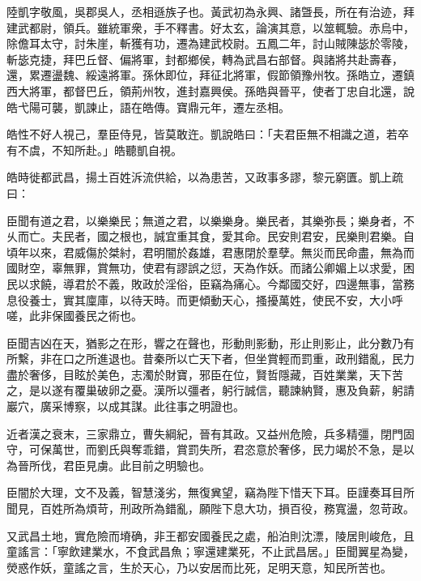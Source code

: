\begin{pinyinscope}
 
 
 陸凱字敬風，吳郡吳人，丞相遜族子也。黃武初為永興、諸曁長，所在有治迹，拜建武都尉，領兵。雖統軍衆，手不釋書。好太玄，論演其意，以筮輒驗。赤烏中，除儋耳太守，討朱崖，斬獲有功，遷為建武校尉。五鳳二年，討山賊陳毖於零陵，斬毖克捷，拜巴丘督、偏將軍，封都鄉侯，轉為武昌右部督。與諸將共赴壽春，還，累遷盪魏、綏遠將軍。孫休即位，拜征北將軍，假節領豫州牧。孫皓立，遷鎮西大將軍，都督巴丘，領荊州牧，進封嘉興侯。孫皓與晉平，使者丁忠自北還，說皓弋陽可襲，凱諫止，語在皓傳。寶鼎元年，遷左丞相。
 
 
 
 
 皓性不好人視己，羣臣侍見，皆莫敢迕。凱說皓曰：「夫君臣無不相識之道，若卒有不虞，不知所赴。」皓聽凱自視。
 
 
 
 
 皓時徙都武昌，揚土百姓泝流供給，以為患苦，又政事多謬，黎元窮匱。凱上疏曰：
 
 
 
 
 臣聞有道之君，以樂樂民；無道之君，以樂樂身。樂民者，其樂弥長；樂身者，不乆而亡。夫民者，國之根也，誠宜重其食，愛其命。民安則君安，民樂則君樂。自頃年以來，君威傷於桀紂，君明闇於姦雄，君惠閉於羣孽。無災而民命盡，無為而國財空，辜無罪，賞無功，使君有謬誤之愆，天為作妖。而諸公卿媚上以求愛，困民以求饒，導君於不義，敗政於淫俗，臣竊為痛心。今鄰國交好，四邊無事，當務息役養士，實其廩庫，以待天時。而更傾動天心，搔擾萬姓，使民不安，大小呼嗟，此非保國養民之術也。
 
 
 
 
 臣聞吉凶在天，猶影之在形，響之在聲也，形動則影動，形止則影止，此分數乃有所繫，非在口之所進退也。昔秦所以亡天下者，但坐賞輕而罰重，政刑錯亂，民力盡於奢侈，目眩於美色，志濁於財寶，邪臣在位，賢哲隱藏，百姓業業，天下苦之，是以遂有覆巢破卵之憂。漢所以彊者，躬行誠信，聽諫納賢，惠及負薪，躬請巖穴，廣采博察，以成其謀。此往事之明證也。
 
 
 
 
 近者漢之衰末，三家鼎立，曹失綱紀，晉有其政。又益州危險，兵多精彊，閉門固守，可保萬世，而劉氏與奪乖錯，賞罰失所，君恣意於奢侈，民力竭於不急，是以為晉所伐，君臣見虜。此目前之明驗也。
 
 
 
 
 臣闇於大理，文不及義，智慧淺劣，無復兾望，竊為陛下惜天下耳。臣謹奏耳目所聞見，百姓所為煩苛，刑政所為錯亂，願陛下息大功，損百役，務寬盪，忽苛政。
 
 
 
 
 又武昌土地，實危險而塉确，非王都安國養民之處，船泊則沈漂，陵居則峻危，且童謠言：「寧飲建業水，不食武昌魚；寧還建業死，不止武昌居。」臣聞翼星為變，熒惑作妖，童謠之言，生於天心，乃以安居而比死，足明天意，知民所苦也。
 

\end{pinyinscope}
